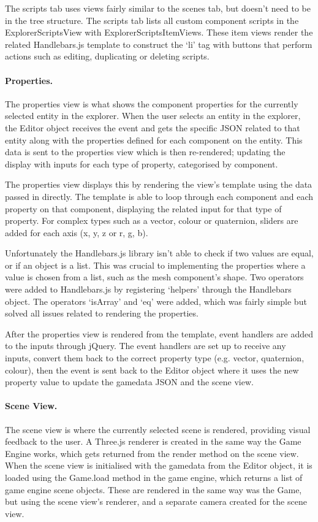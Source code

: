	The scripts tab uses views fairly similar to the scenes tab, but doesn't need to be in the tree structure. The scripts tab lists all custom component scripts in the ExplorerScriptsView with ExplorerScriptsItemViews. These item views render the related Handlebars.js template to construct the `li' tag with buttons that perform actions such as editing, duplicating or deleting scripts.

	\paragraph{Properties.}
	The properties view is what shows the component properties for the currently selected entity in the explorer. When the user selects an entity in the explorer, the Editor object receives the event and gets the specific JSON related to that entity along with the properties defined for each component on the entity. This data is sent to the properties view which is then re-rendered; updating the display with inputs for each type of property, categorised by component.

	The properties view displays this by rendering the view's template using the data passed in directly. The template is able to loop through each component and each property on that component, displaying the related input for that type of property. For complex types such as a vector, colour or quaternion, sliders are added for each axis (x, y, z or r, g, b).

	Unfortunately the Handlebars.js library isn't able to check if two values are equal, or if an object is a list. This was crucial to implementing the properties where a value is chosen from a list, such as the mesh component's shape. Two operators were added to Handlebars.js by registering `helpers' through the Handlebars object. The operators `isArray' and `eq' were added, which was fairly simple but solved all issues related to rendering the properties.

	After the properties view is rendered from the template, event handlers are added to the inputs through jQuery. The event handlers are set up to receive any inputs, convert them back to the correct property type (e.g. vector, quaternion, colour), then the event is sent back to the Editor object where it uses the new property value to update the gamedata JSON and the scene view.

	\paragraph{Scene View.}
	The scene view is where the currently selected scene is rendered, providing visual feedback to the user. A Three.js renderer is created in the same way the Game Engine works, which gets returned from the render method on the scene view. When the scene view is initialised with the gamedata from the Editor object, it is loaded using the Game.load method in the game engine, which returns a list of game engine scene objects. These are rendered in the same way was the Game, but using the scene view's renderer, and a separate camera created for the scene view.

